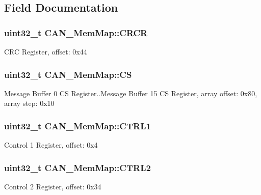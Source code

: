 \subsection{Field Documentation}
\hypertarget{struct_c_a_n___mem_map_ad1266b0f09eab6a6efd5778d0704da82}{}
\subsubsection[{C\+R\+C\+R}]{\setlength{\rightskip}{0pt plus 5cm}uint32\+\_\+t C\+A\+N\+\_\+\+Mem\+Map\+::\+C\+R\+C\+R}\label{struct_c_a_n___mem_map_ad1266b0f09eab6a6efd5778d0704da82}
C\+R\+C Register, offset\+: 0x44 \hypertarget{struct_c_a_n___mem_map_ac511ae72304784d21dd721b3da9b0e34}{}
\subsubsection[{C\+S}]{\setlength{\rightskip}{0pt plus 5cm}uint32\+\_\+t C\+A\+N\+\_\+\+Mem\+Map\+::\+C\+S}\label{struct_c_a_n___mem_map_ac511ae72304784d21dd721b3da9b0e34}
Message Buffer 0 C\+S Register..Message Buffer 15 C\+S Register, array offset\+: 0x80, array step\+: 0x10 \hypertarget{struct_c_a_n___mem_map_aa7e5faeb995f97f465296095ec696576}{}
\subsubsection[{C\+T\+R\+L1}]{\setlength{\rightskip}{0pt plus 5cm}uint32\+\_\+t C\+A\+N\+\_\+\+Mem\+Map\+::\+C\+T\+R\+L1}\label{struct_c_a_n___mem_map_aa7e5faeb995f97f465296095ec696576}
Control 1 Register, offset\+: 0x4 \hypertarget{struct_c_a_n___mem_map_a41eb581b62dccef45c7217265649e0ea}{}
\subsubsection[{C\+T\+R\+L2}]{\setlength{\rightskip}{0pt plus 5cm}uint32\+\_\+t C\+A\+N\+\_\+\+Mem\+Map\+::\+C\+T\+R\+L2}\label{struct_c_a_n___mem_map_a41eb581b62dccef45c7217265649e0ea}
Control 2 Register, offset\+: 0x34 \hypertarget{struct_c_a_n___mem_map_ae333e3fdb5adc42d26fa7a9b9c2014f4}{}
